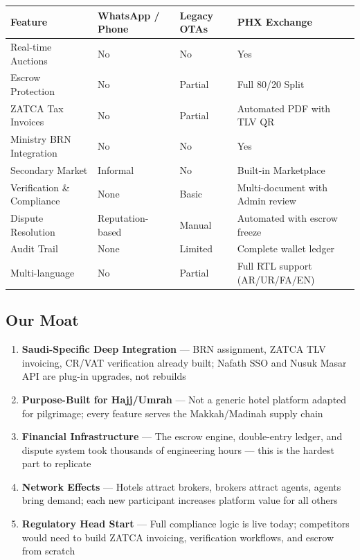 \documentclass[11pt,a4paper]{article}
\providecommand{\tightlist}{%
  \setlength{\itemsep}{0pt}\setlength{\parskip}{0pt}}
\begin{document}
\begin{center}
\begin{tabular}{|>{\raggedright\arraybackslash}p{3.5cm}|>{\raggedright\arraybackslash}p{3cm}|>{\raggedright\arraybackslash}p{2.5cm}|>{\raggedright\arraybackslash}p{4cm}|}
\hline
\rowcolor{headergray}
\textbf{Feature} & \textbf{WhatsApp / Phone} & \textbf{Legacy OTAs} & \textbf{PHX Exchange} \\
\hline
Real-time Auctions & No & No & Yes \\
\hline
Escrow Protection & No & Partial & Full 80/20 Split \\
\hline
ZATCA Tax Invoices & No & Partial & Automated PDF with TLV QR \\
\hline
Ministry BRN Integration & No & No & Yes \\
\hline
Secondary Market & Informal & No & Built-in Marketplace \\
\hline
Verification \& Compliance & None & Basic & Multi-document with Admin review \\
\hline
Dispute Resolution & Reputation-based & Manual & Automated with escrow freeze \\
\hline
Audit Trail & None & Limited & Complete wallet ledger \\
\hline
Multi-language & No & Partial & Full RTL support (AR/UR/FA/EN) \\
\hline
\end{tabular}
\end{center}

\vspace{0.5cm}

\subsection*{Our Moat}
\begin{enumerate}
\tightlist
\item \textbf{Saudi-Specific Deep Integration} --- BRN assignment, ZATCA TLV invoicing, CR/VAT verification already built; Nafath SSO and Nusuk Masar API are plug-in upgrades, not rebuilds
\item \textbf{Purpose-Built for Hajj/Umrah} --- Not a generic hotel platform adapted for pilgrimage; every feature serves the Makkah/Madinah supply chain
\item \textbf{Financial Infrastructure} --- The escrow engine, double-entry ledger, and dispute system took thousands of engineering hours --- this is the hardest part to replicate
\item \textbf{Network Effects} --- Hotels attract brokers, brokers attract agents, agents bring demand; each new participant increases platform value for all others
\item \textbf{Regulatory Head Start} --- Full compliance logic is live today; competitors would need to build ZATCA invoicing, verification workflows, and escrow from scratch
\end{enumerate}
\end{document}
